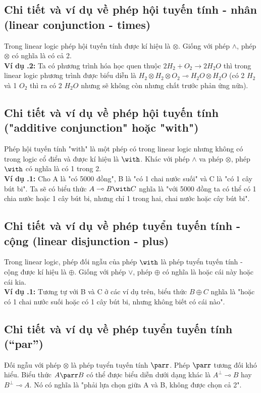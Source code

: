 \documentclass[a4paper]{article}
\begin{document}
\subsection{Chi tiết và ví dụ về phép hội tuyến tính - nhân (linear conjunction - times)}
Trong linear logic phép hội tuyến tính được kí hiệu là $\otimes$. Giống với phép $\land$, phép $\otimes$ có nghĩa là có cả 2.\\

\textbf{Ví dụ \thesubsection.2:} Ta có phương trình hóa học quen thuộc $2H_2 + O_2 \rightarrow 2H_2O$ thì trong linear logic phương trình được biểu diễn là $H_2 \otimes H_2 \otimes O_2 \multimap H_2O \otimes H_2O$ (có 2 $H_2$ và 1 $O_2$ thì ra có 2 $H_2O$ nhưng sẽ không còn nhưng chất trước phản ứng nữa).

\subsection{Chi tiết và ví dụ về phép hội tuyến tính ("additive conjunction" hoặc "with")}
Phép hội tuyến tính "with" là một phép có trong linear logic nhưng không có trong logic cổ điển và được kí hiệu là $\with$. Khác với phép $\land$ va phép $\otimes$, phép $\with$ có nghĩa là có 1 trong 2.\\

\textbf{Ví dụ \thesubsection.1:} Cho A là "có 5000 đồng", B là "có 1 chai nước suối" và C là "có 1 cây bút bi". Ta sẽ có biểu thức $A \multimap B \with C$ nghĩa là "với 5000 đồng ta có thể có 1 chia nước hoặc 1 cây bút bi, nhưng chỉ 1 trong hai, chai nước hoặc cây bút bi".

\subsection{Chi tiết và ví dụ về phép tuyển tuyến tính - cộng (linear disjunction - plus)}
Trong linear logic, phép đối ngẫu của phép $\with$ là phép tuyển tuyến tính - cộng được kí hiệu là $\oplus$. Giống với phép $\lor$, phép $\oplus$ có nghĩa là hoặc cái này hoặc cái kia.\\

\textbf{Ví dụ \thesubsection.1:} Tương tự với B và C ở các ví dụ trên, biểu thức $B \oplus C$ nghĩa là "hoặc có 1 chai nước suối hoặc có 1 cây bút bi, nhưng không biết có cái nào".

\subsection{Chi tiết và ví dụ về phép tuyển tuyến tính (“par”)}
Đối ngẫu với phép $\otimes$ là phép tuyển tuyến tính $\parr$. Phép $\parr$ tương đối khó hiểu. Biểu thức $A \parr B$ có thể được biểu diễn dưới dạng khác là $A^{\bot} \multimap B$ hay $B^{\bot} \multimap A$. Nó có nghĩa là "phải lựa chọn giữa A và B, không được chọn cả 2".\\
\end{document}

